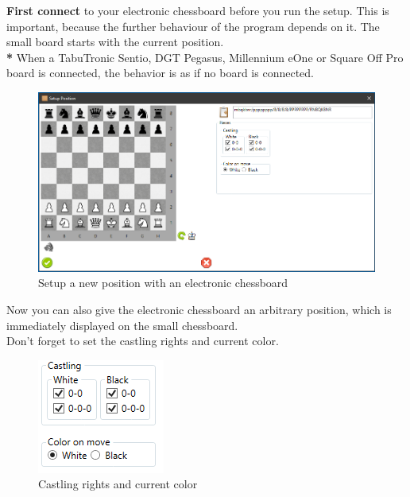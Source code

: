 \documentclass[11pt,a4paper]{article}
\begin{document}
\textbf{First connect} to your electronic chessboard before you run the setup. This is important, because the further behaviour of the program depends on it.
The small board starts with the current position.\\
\textbf{{\color{red}*}} When a TabuTronic Sentio, DGT Pegasus, Millennium eOne or Square Off Pro board is connected, the behavior is as if no board is connected.

\begin{figure}[H]
	\centering
	\includegraphics[scale=0.5]{SetupPosition4.png}
	\caption{Setup a new position with an electronic chessboard}
	\label{fig:SetupPosition4}
\end{figure}

Now you can also give the electronic chessboard an arbitrary position, which is immediately displayed on the small chessboard.\\
Don't forget to set the castling rights and current color.

\begin{figure}[H]
	\centering
	\includegraphics[scale=1.0]{castling.png}
	\caption{Castling rights and current color}
	\label{fig:castling2}
\end{figure}
\end{document}
